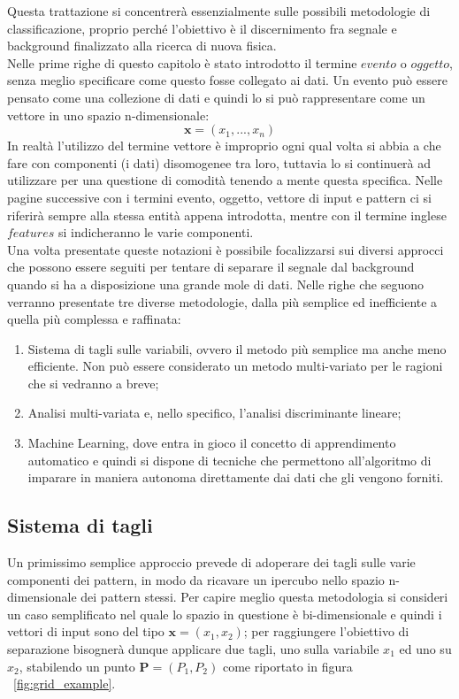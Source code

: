 Questa trattazione si concentrerà essenzialmente sulle possibili metodologie di classificazione, proprio perché l'obiettivo è il discernimento fra segnale e background finalizzato alla ricerca di nuova fisica. \\
Nelle prime righe di questo capitolo è stato introdotto il termine $\textit{evento}$ o $\textit{oggetto}$, senza meglio specificare come questo fosse collegato ai dati. Un evento può essere pensato come una collezione di dati e quindi lo si può rappresentare come un vettore in uno spazio n-dimensionale: 
\begin{equation}
\textbf{x} = (x_{1},...,x_{n})
\end{equation}
In realtà l'utilizzo del termine vettore è improprio ogni qual volta si abbia a che fare con componenti (i dati) disomogenee tra loro, tuttavia lo si continuerà ad utilizzare per una questione di comodità tenendo a mente questa specifica. Nelle pagine successive con i termini evento, oggetto, vettore di input e pattern ci si riferirà sempre alla stessa entità appena introdotta, mentre con il termine inglese $\textit{features}$ si indicheranno le varie componenti. \\ 
Una volta presentate queste notazioni è possibile focalizzarsi sui diversi approcci che possono essere seguiti per tentare di separare il segnale dal background quando si ha a disposizione una grande mole di dati. Nelle righe che seguono verranno presentate tre diverse metodologie, dalla più semplice ed inefficiente a quella più complessa e raffinata:
\begin{enumerate}
	\item Sistema di tagli sulle variabili, ovvero il metodo più semplice ma anche meno efficiente. Non può essere considerato un metodo multi-variato per le ragioni che si vedranno a breve;
	\item Analisi multi-variata e, nello specifico, l'analisi discriminante lineare;
	\item Machine Learning, dove entra in gioco il concetto di apprendimento automatico e quindi si dispone di tecniche che permettono all'algoritmo di imparare in maniera autonoma direttamente dai dati che gli vengono forniti.
\end{enumerate}

\newpage

\subsection{Sistema di tagli}
\label{sistema di tagli}
Un primissimo semplice approccio prevede di adoperare dei tagli sulle varie componenti dei pattern, in modo da ricavare un ipercubo nello spazio n-dimensionale dei pattern stessi. Per capire meglio questa metodologia si consideri un caso semplificato nel quale lo spazio in questione è bi-dimensionale e quindi i vettori di input sono del tipo $\textbf{x} = (x_1,x_2)$; per raggiungere l'obiettivo di separazione bisognerà dunque applicare due tagli, uno sulla variabile $x_1$ ed uno su $x_2$, stabilendo un punto $\textbf{P} = (P_1,P_2)$ come riportato in figura ~\ref{fig:grid_example}.

